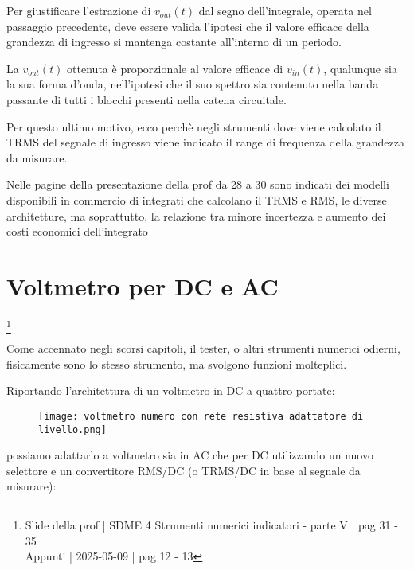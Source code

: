 Per giustificare l'estrazione di $v_{out} (t)$ dal segno dell'integrale, 
operata nel passaggio precedente, deve essere valida l'ipotesi che il valore efficace della grandezza di ingresso si mantenga costante all'interno di un periodo. \newline

La $v_{out} (t)$ ottenuta è proporzionale al valore efficace di $v_{in} (t)$, 
qualunque sia la sua forma d'onda, 
nell'ipotesi che il suo spettro sia contenuto nella banda passante di tutti i blocchi presenti nella catena circuitale. \newline 

Per questo ultimo motivo, ecco perchè negli strumenti dove viene calcolato il TRMS del segnale di ingresso viene indicato il range di frequenza della grandezza da misurare. \newline 

\begin{tcolorbox}
    Nelle pagine della presentazione della prof da 28 a 30 sono indicati dei modelli disponibili in commercio di integrati che calcolano il TRMS e RMS, 
    le diverse architetture, ma soprattutto, la relazione tra minore incertezza e aumento dei costi economici dell'integrato
\end{tcolorbox}

\newpage 

\section{Voltmetro per DC e AC}
\footnote{Slide della prof | SDME 4 Strumenti numerici indicatori - parte V | pag 31 - 35\\  
Appunti | 2025-05-09 | pag 12 - 13}

Come accennato negli scorsi capitoli, il tester, o altri strumenti numerici odierni, fisicamente sono lo stesso strumento, ma svolgono funzioni molteplici. \newline 

Riportando l'architettura di un voltmetro in DC a quattro portate: 

\begin{figure}[h]
    \centering
    \texttt{[image: voltmetro numero con rete resistiva adattatore di livello.png]}
\end{figure}

possiamo adattarlo a voltmetro sia in AC che per DC utilizzando un nuovo selettore e un convertitore RMS/DC (o TRMS/DC in base al segnale da misurare): 

